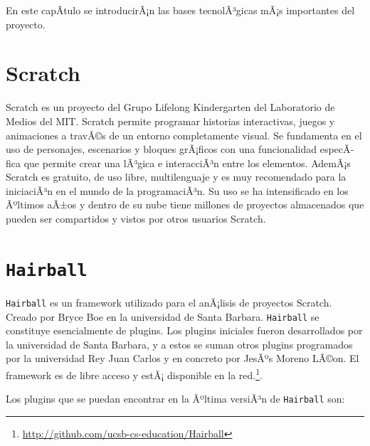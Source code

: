 \documentclass[a4paper, 12pt]{book}
\begin{document}
En este capÃ­tulo se introducirÃ¡n las bases tecnolÃ³gicas mÃ¡s importantes del proyecto.


\section{Scratch}
\label{sec:seccion2}
Scratch es un proyecto del Grupo Lifelong Kindergarten del Laboratorio de Medios del MIT.
Scratch permite programar historias interactivas, juegos y animaciones a travÃ©s de un
entorno completamente visual. Se fundamenta en el uso de personajes, escenarios y bloques
grÃ¡ficos con una funcionalidad especÃ­fica que permite crear una lÃ³gica e interacciÃ³n
entre los elementos. AdemÃ¡s Scratch es gratuito, de uso libre, multilenguaje y es muy
recomendado para la iniciaciÃ³n en el mundo de la programaciÃ³n. Su uso se ha intensificado
en los Ãºltimos aÃ±os y dentro de su nube tiene millones de proyectos almacenados que
pueden ser compartidos y vistos por otros usuarios Scratch.


\section{\texttt{Hairball}}
\label{sec:seccion3}
\texttt{Hairball} es un framework utilizado para el anÃ¡lisis de proyectos Scratch. Creado por Bryce
Boe en la universidad de Santa Barbara. \texttt{Hairball} se constituye esencialmente de plugins.
Los plugins iniciales fueron desarrollados por la universidad de Santa Barbara, y a estos se
suman otros plugins programados por la universidad Rey Juan Carlos y en concreto por JesÃºs Moreno LÃ©on.
El framework es de libre acceso y estÃ¡ disponible en la red.\footnote{\url{http://github.com/ucsb-cs-education/Hairball}}.

Los plugins que se puedan encontrar en la Ãºltima versiÃ³n de \texttt{Hairball} son:
\end{document}
